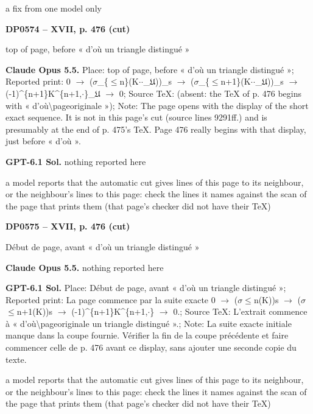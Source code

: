 a fix from one model only\par
\par\noindent\hypertarget{DP0574}{}\textbf{DP0574 -- XVII, p. 476 (cut)}\par
top of page, before « d'où un triangle distingué »\par
\textbf{Claude Opus 5.5.} Place: top of page, before « d'où un triangle distingué »; Reported print: 0 \ensuremath{\to} (\ensuremath{\sigma}\_\{\ensuremath{\leq}n\}(K\ensuremath{\cdot}\ensuremath{\cdot}\_\ensuremath{𝔘}))\_s \ensuremath{\to} (\ensuremath{\sigma}\_\{\ensuremath{\leq}n+1\}(K\ensuremath{\cdot}\ensuremath{\cdot}\_\ensuremath{𝔘}))\_s \ensuremath{\to} (-1)\textasciicircum{}\{n+1\}K\textasciicircum{}\{n+1,\ensuremath{\cdot}\}\_\ensuremath{𝔘} \ensuremath{\to} 0; Source TeX: (absent: the TeX of p. 476 begins with « d'où\textbackslash{}pageoriginale »); Note: The page opens with the display of the short exact sequence. It is not in this page's cut (source lines 9291ff.) and is presumably at the end of p. 475's TeX. Page 476 really begins with that display, just before « d'où ».\par
\textbf{GPT-6.1 Sol.} nothing reported here\par
a model reports that the automatic cut gives lines of this page to its neighbour, or the neighbour's lines to this page: check the lines it names against the scan of the page that prints them (that page's checker did not have their TeX)\par
\par\noindent\hypertarget{DP0575}{}\textbf{DP0575 -- XVII, p. 476 (cut)}\par
Début de page, avant « d'où un triangle distingué »\par
\textbf{Claude Opus 5.5.} nothing reported here\par
\textbf{GPT-6.1 Sol.} Place: Début de page, avant « d'où un triangle distingué »; Reported print: La page commence par la suite exacte 0 \ensuremath{\to} (\ensuremath{\sigma}\ensuremath{\leq}n(K))s \ensuremath{\to} (\ensuremath{\sigma}\ensuremath{\leq}n+1(K))s \ensuremath{\to} (-1)\textasciicircum{}\{n+1\}K\textasciicircum{}\{n+1,\ensuremath{\cdot}\} \ensuremath{\to} 0.; Source TeX: L'extrait commence à « d'où\textbackslash{}pageoriginale un triangle distingué ».; Note: La suite exacte initiale manque dans la coupe fournie. Vérifier la fin de la coupe précédente et faire commencer celle de p. 476 avant ce display, sans ajouter une seconde copie du texte.\par
a model reports that the automatic cut gives lines of this page to its neighbour, or the neighbour's lines to this page: check the lines it names against the scan of the page that prints them (that page's checker did not have their TeX)\par

